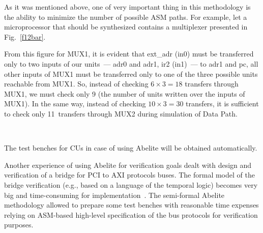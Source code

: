 \begin{multicols}{2}

   As it was mentioned above, one of very important thing in this methodology is the ability to minimize the
number of possible ASM paths. For example, let a microprocessor that should be synthesized contains a
multiplexer   presented in Fig.~\ref{f12bar}.



   From this figure for MUX1, it is evident that ext\_adr (in0) must be transferred only to two inputs of
our units~--- adr0 and adr1, ir2 (in1)~--- to adr1 and pc, all other inputs
of MUX1 must be transferred only to one of the three possible units
reachable from MUX1. 
So, instead
of checking $6\times 3=18$ transfers through MUX1, we must check only 9 (the number of units written over
the inputs of MUX1). In the same way, instead of checking $10\times 3=30$ transfers, it is sufficient to check only
11~transfers through MUX2 during simulation of Data Path.
{%

}

 
\begin{figure*} %
\vspace*{1pt}
\begin{center}
\mbox{%
\epsfxsize=163.32mm
}
\end{center}
\vspace*{-9pt}
\begin{minipage}[t]{79.5mm}
\end{minipage}
\hfill
\begin{minipage}[t]{79.5mm}
       \end{minipage}
       \end{figure*}


  The test benches for CUs in case of using Abelite will be obtained automatically.

   Another experience of using Abelite for verification goals dealt with design and verification of a bridge for
PCI to AXI protocols buses. The formal model of the bridge verification (e.g., based on a language of the
temporal logic) becomes very big and time-consuming for implementation~\cite{27bar}. The semi-formal
Abelite methodology allowed to prepare some test benches with reasonable time expenses relying on ASM-based
high-level specification of the bus protocols for verification purposes.
{%

}
\end{multicols}
